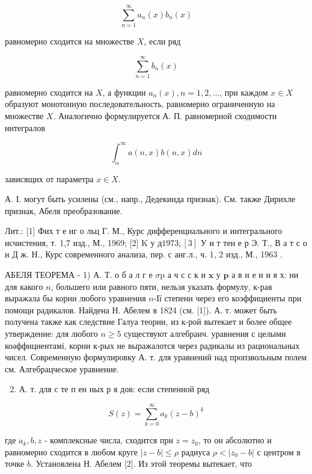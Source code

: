 \documentclass[10pt]{article}
\begin{document}
\[

\sum_{n=1}^{\infty} a_{n}(x) b_{n}(x)

\]



равномерно сходится на множестве $X$, если ряд



\[

\sum_{n=1}^{\infty} b_{n}(x)

\]



равномерно сходится на $X$, а функции $a_{n}(x), n=1,2, \ldots$, при каждом $x \in X$ образуют монотонную последовательность, равномерно ограниченную на множестве $X$. Аналогично формулируется А. П. равномерной сходимости интегралов



\[

\int_{\alpha}^{\infty} a(n, x) b(n, x) d n

\]



зависящих от параметра $x \in X$.



А. І. могут быть усилены (см., напр., Дедекинда признак). См. также Дирихле признак, Абеля преобразование.



Лит.: [1] Фих т е нг о льц $Г$. М., Курс дифференциального и интегрального исчистения, т. 1,7 изд., М., 1969; [2] K у д$1973 ;[3]$ У и т тен е р Э. Т., В а т с о н Д ж. Н., Курс современного анализа, пер. с анг.л., ч. 1, 2 изд., М., 1963 .



АБЕЛЯ ТЕОРЕМА - 1) А. Т. о б а л $г$ е $\sigma \mathrm{p}$ а ч с с к и $\mathbf{x}$ у $\mathbf{p}$ а в н е н и я х: ни для какого $n$, большего или равного пяти, нельзя указать формулу, к-рая выражала бы корни любого уравнения $n$-Ії степени через его коэффициенты при помощи радикалов. Найдена Н. Абелем в 1824 (см. [1]). А. т. может быть получена также как следствие Галуа теории, из к-рой вытекает и более общее утверждение: для любого $n \geqslant 5$ существуют алгебраич. уравнения с целыми коәффициентамі, корни к-рых не выражалотся через радикалы из рациональных чисел. Современную формулировку А. т. для уравнений над пропзвольным полем см. Алгебрацческое уравнение.



\begin{enumerate}

  \setcounter{enumi}{1}

  \item А. т. для с те п ен ных р я дов: если степенной ряд

\end{enumerate}



\[

S(z)=\sum_{k=0}^{\infty} a_{k}(z-b)^{k}

\]



где $a_{k}, b, z$ - комплексные числа, сходится при $z=z_{0}$, то он абсолютно и равномерно сходится в любом круге $|z-b| \leqslant \rho$ радиуса $\rho<\left|z_{0}-b\right|$ с центром в точке $b$. Установлена Н. Абелем [2]. Из этой теоремы вытекает, что
\end{document}
